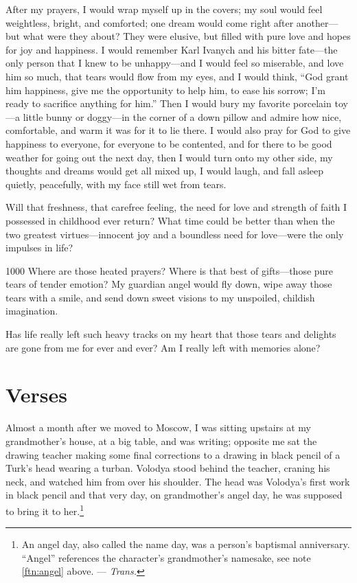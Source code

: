 After my prayers, I would wrap myself up in the covers; my soul would feel weightless, bright, and comforted; one dream would come right after another---but what were they about? They were elusive, but filled with pure love and hopes for joy and happiness. I would remember Karl Ivanych and his bitter fate---the only person that I knew to be unhappy---and I would feel so miserable, and love him so much, that tears would flow from my eyes, and I would think, ``God grant him happiness, give me the opportunity to help him, to ease his sorrow; I'm ready to sacrifice anything for him.'' Then I would bury my favorite porcelain toy---a little bunny or doggy---in the corner of a down pillow and admire how nice, comfortable, and warm it was for it to lie there. I would also pray for God to give happiness to everyone, for everyone to be contented, and for there to be good weather for going out the next day, then I would turn onto my other side, my thoughts and dreams would get all mixed up, I would laugh, and fall asleep quietly, peacefully, with my face still wet from tears.

Will that freshness, that carefree feeling, the need for love and strength of faith I possessed in childhood ever return? What time could be better than when the two greatest virtues---innocent joy and a boundless need for love---were the only impulses in life?

\begin{tolerant}{1000}
Where are those heated prayers? Where is that best of gifts---those pure tears of tender emotion? My guardian angel would fly down, wipe away those tears with a smile, and send down sweet visions to my unspoiled, childish imagination.
\end{tolerant}

Has life really left such heavy tracks on my heart that those tears and delights are gone from me for ever and ever? Am I really left with memories alone?

\chapter{Verses} %

Almost a month after we moved to Moscow, I was sitting upstairs at my grandmother's house, at a big table, and was writing; opposite me sat the drawing teacher making some final corrections to a drawing in black pencil of a Turk's head wearing a turban. Volodya stood behind the teacher, craning his neck, and watched him from over his shoulder. The head was Volodya's first work in black pencil and that very day, on grandmother's angel day, he was supposed to bring it to her.\footnote{An angel day, also called the name day, was a person's baptismal anniversary. ``Angel'' references the character's grandmother's namesake, see note \ref{ftn:angel} above. --- \textit{Trans.}}

